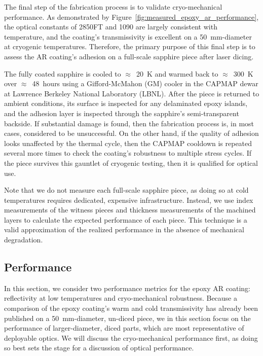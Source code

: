 The final step of the fabrication process is to validate cryo-mechanical performance. As demonstrated by Figure~\ref{fig:measured_epoxy_ar_performance}, the optical constants of 2850FT and 1090 are largely consistent with temperature, and the coating's transmissivity is excellent on a 50~mm-diameter at cryogenic temperatures. Therefore, the primary purpose of this final step is to assess the AR coating's adhesion on a full-scale sapphire piece after laser dicing.

The fully coated sapphire is cooled to $\approx$~20~K and warmed back to $\approx$~300~K over $\approx$~48~hours using a Gifford-McMahon (GM) cooler in the CAPMAP dewar at Lawrence Berkeley National Laboratory (LBNL). After the piece is returned to ambient conditions, its surface is inspected for any delaminated epoxy islands, and the adhesion layer is inspected through the sapphire's semi-transparent backside. If substantial damage is found, then the fabrication process is, in most cases, considered to be unsuccessful. On the other hand, if the quality of adhesion looks unaffected by the thermal cycle, then the CAPMAP cooldown is repeated several more times to check the coating's robustness to multiple stress cycles. If the piece survives this gauntlet of cryogenic testing, then it is qualified for optical use. 

Note that we do not measure each full-scale sapphire piece, as doing so at cold temperatures requires dedicated, expensive infrastructure. Instead, we use index measurements of the witness pieces and thickness measurements of the machined layers to calculate the expected performance of each piece. This technique is a valid approximation of the realized performance in the absence of mechanical degradation.


\subsection{Performance}
\label{sec:sapphire_ar_coating_epoxy_peformance}

In this section, we consider two performance metrics for the epoxy AR coating: reflectivity at low temperatures and cryo-mechanical robustness. Because a comparison of the epoxy coating's warm and cold transmissivity has already been published on a 50~mm-diameter, un-diced piece, we in this section focus on the performance of larger-diameter, diced parts, which are most representative of deployable optics. We will discuss the cryo-mechanical performance first, as doing so best sets the stage for a discussion of optical performance.

